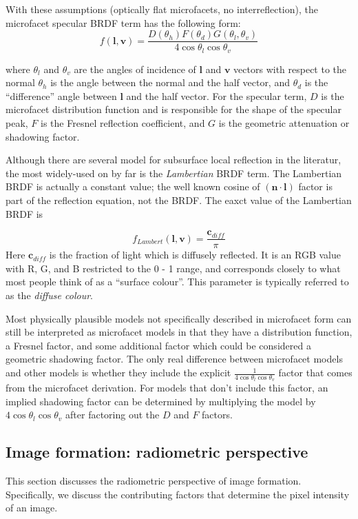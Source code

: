 With these assumptions (optically flat microfacets, no interreflection), the microfacet specular BRDF term has the following form:
$$
f(\mathbf{l}, \mathbf{v}) = \frac{D(\theta_h)F(\theta_d)G(\theta_l, \theta_v)}{4\cos\theta_l\cos\theta_v}
$$

where $\theta_l$ and $\theta_v$ are the angles of incidence of $\mathbf{l}$ and $\mathbf{v}$ vectors with respect to the normal $\theta_h$ is the angle between the normal and the half vector, and $\theta_d$ is the ``difference'' angle between $\mathbf{l}$ and the half vector. For the specular term, $D$ is the microfacet distribution function and is responsible for the shape of the specular peak, $F$ is the Fresnel reflection coefficient, and $G$ is the geometric attenuation or shadowing factor. 

Although there are several model for subsurface local reflection in the literatur, the most widely-used on by far is the \textit{Lambertian} BRDF term. The Lambertian BRDF is actually a constant value; the well known cosine of $(\mathbf{n}\cdot\mathbf{l})$ factor is part of the reflection equation, not the BRDF. The eaxct value of the Lambertian BRDF is

$$
f_{Lambert}(\mathbf{l}, \mathbf{v}) = \frac{\mathbf{c}_{diff}}{\pi}
$$
Here $\mathbf{c}_{diff}$ is the fraction of light which is diffusely reflected. It is an RGB value with R, G, and B restricted to the 0 - 1 range, and corresponds closely to what most people think of as a ``surface colour''. This parameter is typically referred to as the \textit{diffuse colour}.

Most physically plausible models not specifically described in microfacet form can still be interpreted as microfacet models in that they have a distribution function, a Fresnel factor, and some additional factor which could be considered a geometric shadowing factor. The only real difference
between microfacet models and other models is whether they include the explicit $\frac{1}{4\cos\theta_l\cos\theta_v}$ factor that comes from the microfacet derivation. For models that don’t include this factor, an implied shadowing factor can be determined by multiplying the model by $4\cos\theta_l\cos\theta_v$ after factoring out the $D$ and $F$ factors.

\subsection{Image formation: radiometric perspective}
This section discusses the radiometric perspective of image formation. Specifically, we discuss the contributing factors that determine the pixel intensity of an image.

